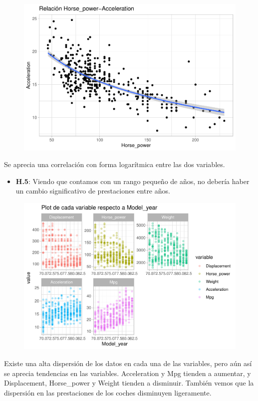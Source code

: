 \begin{figure}[H]\includegraphics[width=.9\linewidth]{img/EDA_files/figure-latex/unnamed-chunk-28-1} \caption{}\end{figure}

Se aprecia una correlación con forma logarítmica entre las dos variables.

\newpage

\begin{itemize}
\item \textbf{H.5}: Viendo que contamos con un rango pequeño de años, no debería haber un cambio significativo de prestaciones entre años.
\end{itemize}

\begin{figure}[H]\includegraphics[width=.9\linewidth]{img/EDA_files/figure-latex/unnamed-chunk-29-1} \caption{}\end{figure}

Existe una alta dispersión de los datos en cada una de las variables, pero aún así se aprecia tendencias en las variables. Acceleration y Mpg tienden a aumentar, y Displacement, Horse\_power y Weight tienden a disminuir. También vemos que la dispersión en las prestaciones de los coches disminuyen ligeramente.

